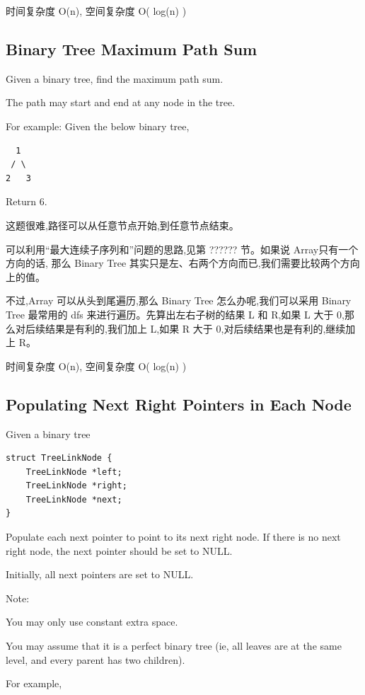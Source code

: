 \documentclass[12pt]{book}
\begin{document}
时间复杂度 O(n), 空间复杂度 O( log(n) )

\subsection{Binary Tree Maximum Path Sum}
\label{sec-4-4-5}
Given a binary tree, find the maximum path sum.

The path may start and end at any node in the tree.

For example:
Given the below binary tree,
\lstset{language=java,label= ,caption= ,numbers=none}
\begin{lstlisting}
  1
 / \
2   3
\end{lstlisting}

Return 6.

这题很难,路径可以从任意节点开始,到任意节点结束。

可以利用“最大连续子序列和”问题的思路,见第 ?????? 节。如果说 Array只有一个方向的话, 那么 Binary Tree 其实只是左、右两个方向而已,我们需要比较两个方向上的值。

不过,Array 可以从头到尾遍历,那么 Binary Tree 怎么办呢,我们可以采用 Binary Tree 最常用的 dfs 来进行遍历。先算出左右子树的结果 L 和 R,如果 L 大于 0,那么对后续结果是有利的,我们加上 L,如果 R 大于 0,对后续结果也是有利的,继续加上 R。

时间复杂度 O(n), 空间复杂度 O( log(n) )

\subsection{Populating Next Right Pointers in Each Node}
\label{sec-4-4-6}
Given a binary tree
\lstset{language=java,label= ,caption= ,numbers=none}
\begin{lstlisting}
struct TreeLinkNode {
    TreeLinkNode *left;
    TreeLinkNode *right;
    TreeLinkNode *next;
}
\end{lstlisting}

Populate each next pointer to point to its next right node. If there is no next right node, the next pointer should be set to NULL.

Initially, all next pointers are set to NULL.

Note:

You may only use constant extra space.

You may assume that it is a perfect binary tree (ie, all leaves are at the same level, and every parent has two children).

For example,
\end{document}

